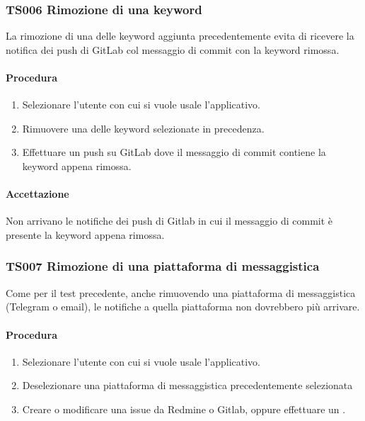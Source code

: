 	\subsubsection{TS006 Rimozione di una keyword}
		La rimozione di una delle keyword aggiunta precedentemente evita di ricevere la notifica dei push di GitLab col messaggio di commit con la keyword rimossa.
		
		\paragraph*{Procedura}
			\begin{enumerate}
				\item Selezionare l'utente con cui si vuole usale l'applicativo.
				\item Rimuovere una delle keyword selezionate in precedenza.
				\item Effettuare un push su GitLab dove il messaggio di commit contiene la keyword appena rimossa.
			\end{enumerate}
		
		\paragraph*{Accettazione}
		Non arrivano le notifiche dei push di Gitlab in cui il messaggio di commit è presente la keyword appena rimossa.
		
	\subsubsection{TS007 Rimozione di una piattaforma di messaggistica}
		Come per il test precedente, anche rimuovendo una piattaforma di messaggistica (Telegram o email), le notifiche a quella piattaforma non dovrebbero più arrivare.
		
		\paragraph*{Procedura}
		\begin{enumerate}
			\item Selezionare l'utente con cui si vuole usale l'applicativo.
			\item Deselezionare una piattaforma di messaggistica precedentemente selezionata
			\item Creare o modificare una issue da Redmine o Gitlab, oppure effettuare un . 
		\end{enumerate}
	
